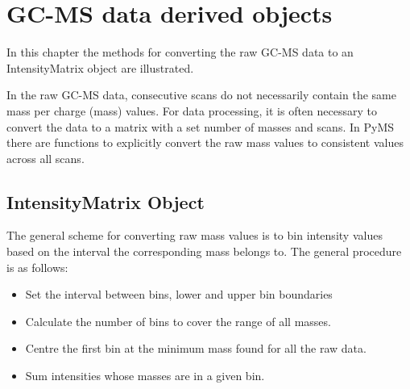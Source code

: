 

\chapter{GC-MS data derived objects}

In this chapter the methods for converting the raw GC-MS data to an
IntensityMatrix object are illustrated.

In the raw GC-MS data, consecutive scans do not necessarily contain the same
mass per charge (mass) values. For data processing, it is often necessary to
convert the data to a matrix with a set number of masses and scans. In PyMS
there are functions to explicitly convert the raw mass values to consistent
values across all scans.

\section{\label{sec:intensity-matrix}IntensityMatrix Object}
The general scheme for converting raw mass values is to bin intensity values
based on the interval the corresponding mass belongs to. The general procedure
is as follows:
\begin{itemize}
    \item Set the interval between bins, lower and upper bin boundaries
    \item Calculate the number of bins to cover the range of all masses.
    \item Centre the first bin at the minimum mass found for all the raw data.
    \item Sum intensities whose masses are in a given bin.
\end{itemize}

